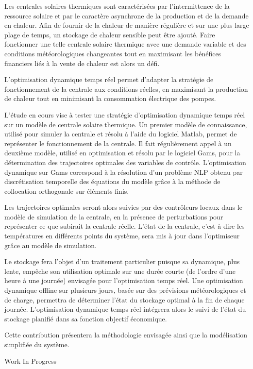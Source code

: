 {\normalsize
Les centrales solaires thermiques sont caractérisées par l'intermittence de la ressource solaire et par le caractère asynchrone de la production et de la demande en chaleur. Afin de fournir de la chaleur de manière régulière et sur une plus large plage de temps, un stockage de chaleur sensible peut être ajouté. Faire fonctionner une telle centrale solaire thermique avec une demande variable et des conditions météorologiques changeantes tout en maximisant les bénéfices financiers liés à la vente de chaleur est alors un défi.







L'optimisation dynamique temps réel permet d'adapter la stratégie de fonctionnement de la centrale aux conditions réelles, en maximisant la production de chaleur tout en minimisant la consommation électrique des pompes.







L'étude en cours vise à tester une stratégie d'optimisation dynamique temps réel sur un modèle de centrale solaire thermique. Un premier modèle de connaissance, utilisé pour simuler la centrale et résolu à l'aide du logiciel Matlab, permet de représenter le fonctionnement de la centrale. Il fait régulièrement appel à un deuxième modèle, utilisé en optimisation et résolu par le logiciel Gams, pour la détermination des trajectoires optimales des variables de contrôle. L'optimisation dynamique sur Gams correspond à la résolution d'un problème NLP obtenu par discrétisation temporelle des équations du modèle grâce à la méthode de collocation orthogonale sur éléments finis.







Les trajectoires optimales seront alors suivies par des contrôleurs locaux dans le modèle de simulation de la centrale, en la présence de perturbations pour représenter ce que subirait la centrale réelle. L'état de la centrale, c'est-à-dire les températures en différents points du système, sera mis à jour dans l'optimiseur grâce au modèle de simulation.







Le stockage fera l'objet d'un traitement particulier puisque sa dynamique, plus lente, empêche son utilisation optimale sur une durée courte (de l'ordre d'une heure à une journée) envisagée pour l'optimisation temps réel. Une optimisation dynamique offline sur plusieurs jours, basée sur des prévisions météorologiques et de charge, permettra de déterminer l'état du stockage optimal à la fin de chaque journée. L'optimisation dynamique temps réel intégrera alors le suivi de l'état du stockage planifié dans sa fonction objectif économique.







Cette contribution présentera la méthodologie envisagée ainsi que la modélisation simplifiée du système.

 \vfill Work In Progress

}
 
